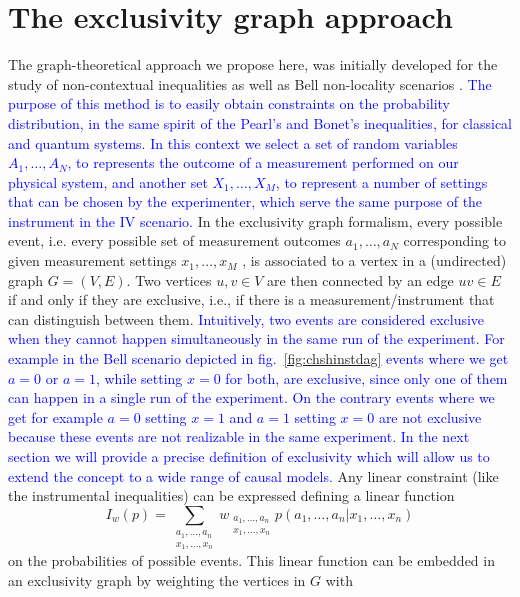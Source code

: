 \documentclass[letterpaper]{article}
\begin{document}
\section{The exclusivity graph approach}
The graph-theoretical approach we propose here, was initially developed for the
study of non-contextual inequalities \cite{cabello2014} as well as Bell
non-locality scenarios \cite{acin2015}. 
\textcolor{blue}{
The purpose of this method is to easily obtain constraints on the probability distribution, in the same spirit of the Pearl's
and Bonet's inequalities, for classical and quantum systems.
In this context we select a set of random variables $A_1,\ldots,A_N$, to represents 
the outcome of a measurement performed on our physical system,
and another set $X_1,\ldots,X_M$, to represent a number of settings that can be chosen by
 the experimenter, which serve the same purpose of the instrument in the IV scenario. 
}
In the exclusivity graph formalism, every possible event, i.e. every possible set of measurement
outcomes $a_1,\ldots, a_N$ corresponding to given measurement settings
$x_1,\ldots,x_M$ , is
associated to a vertex in a (undirected) graph $G = (V, E)$. 
Two vertices $u, v \in V$ are then connected by an edge $uv \in E$ if and only if they are
exclusive, i.e., if there is a measurement/instrument that can distinguish between
them. 
\textcolor{blue}{
Intuitively, two events are considered exclusive when they cannot happen simultaneously in the same run of
the experiment.
For example in the Bell scenario depicted in fig.~\ref{fig:chshinstdag} events where we get $a = 0$ or $a = 1$, while
setting $x = 0$ for both, are exclusive, since only one of them can happen in a single run of the experiment.
On the contrary events where we get for example $a = 0$ setting $x = 1$ and $a=1$ setting $x=0$ are not exclusive
because these events are not realizable in the same experiment.
In the next section we will provide a precise definition of exclusivity which will allow us to extend the concept
to a wide range of causal models.
}
Any linear constraint (like the instrumental inequalities) can be
expressed defining a linear function
\begin{equation}
    I_w(p) = \sum_{\substack{a_1,\ldots,a_n\\x_1,\ldots,x_n}}
w_{\substack{a_1,\ldots,a_n\\x_1,\ldots,x_n}} p(a_1,\ldots,a_n|x_1,\ldots,x_n)
\end{equation}
on the probabilities of possible events.  This linear function can be
embedded in an exclusivity graph by weighting the vertices in $G$ with
\end{document}
